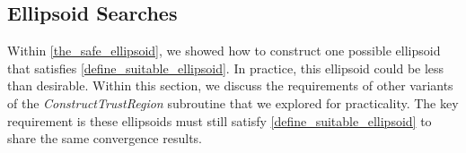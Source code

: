 %
%
%
%
%

% 

\subsection{Ellipsoid Searches}

Within \cref{the_safe_ellipsoid}, we showed how to construct one possible ellipsoid that satisfies \cref{define_suitable_ellipsoid}.
In practice, this ellipsoid could be less than desirable.
Within this section, we discuss the requirements of other variants of the \emph{ConstructTrustRegion} subroutine that we explored for practicality.
The key requirement is these ellipsoids must still satisfy \cref{define_suitable_ellipsoid} to share the same convergence results.

